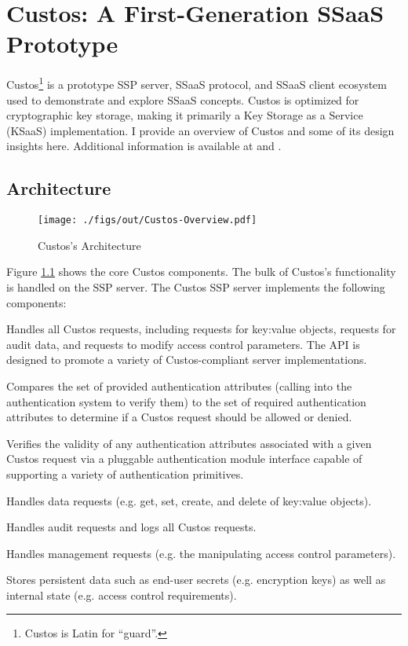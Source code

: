\chapter{Custos: A First-Generation SSaaS Prototype}
\label{chap:custos}

Custos\footnote{Custos is Latin for ``guard''.} is a prototype SSP
server, SSaaS protocol, and SSaaS client ecosystem used to demonstrate
and explore SSaaS concepts. Custos is optimized for cryptographic key
storage, making it primarily a Key Storage as a Service (KSaaS)
implementation. I provide an overview of Custos and some of its design
insights here. Additional information is available at
\cite{custos-masters} and \cite{custos-trios}.

\section{Architecture}
\label{chap:custos:arch}

\begin{figure}[t]
  \centering
  \texttt{[image: ./figs/out/Custos-Overview.pdf]}
  \caption{Custos's Architecture}
  \label{fig:custos-overview}
\end{figure}

Figure \ref{fig:custos-overview} shows the core Custos components. The
bulk of Custos's functionality is handled on the SSP server. The
Custos SSP server implements the following components:

\begin{packed_desc}
\item[API:] Handles all Custos requests, including requests for
  key:value objects, requests for audit data, and requests to modify
  access control parameters. The API is designed to promote a variety
  of Custos-compliant server implementations.
\item[Access Control:] Compares the set of provided authentication
  attributes (calling into the authentication system to verify them)
  to the set of required authentication attributes to determine if a
  Custos request should be allowed or denied.
\item[Authentication:] Verifies the validity of any authentication
  attributes associated with a given Custos request via a pluggable
  authentication module interface capable of supporting a variety of
  authentication primitives.
\item[Data:] Handles data requests (e.g. get, set, create, and
  delete of key:value objects).
\item[Auditing:] Handles audit requests and logs all Custos
  requests.
\item[Management:] Handles management requests (e.g. the
  manipulating access control parameters).
\item[Key-Value Secret Store:] Stores persistent data such as end-user
  secrets (e.g. encryption keys) as well as internal state
  (e.g. access control requirements).
\end{packed_desc}


